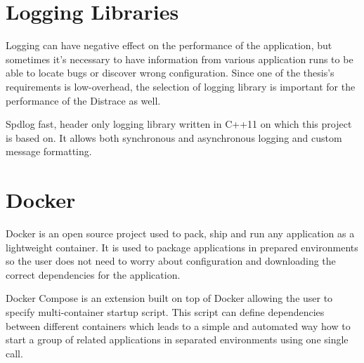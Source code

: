 \section{Logging Libraries}
Logging can have negative effect on the performance of the application, but sometimes it's necessary to have information from various application runs to be able to locate bugs or discover wrong configuration. Since one of the thesis's requirements is low-overhead, the selection of logging library is important for the performance of the Distrace as well. 

Spdlog fast, header only logging library written in C++11 on which this project is based on. It allows both synchronous and asynchronous logging and custom message formatting.
\section{Docker}
Docker is an open source project used to pack, ship and run any application as a lightweight container. It is used to package applications in prepared environments so the user does not need to worry about configuration and downloading the correct dependencies for the application. 

Docker Compose is an extension built on top of Docker allowing the user to specify multi-container startup script. This script can define dependencies between different containers which leads to a simple and automated way how to start a group of related applications in separated environments using one single call. 

